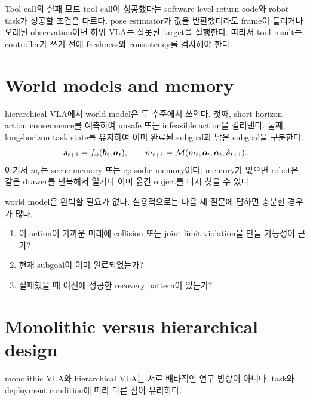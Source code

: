 \begin{warningbox}{Tool call의 실패 모드}
tool call이 성공했다는 software-level return code와 robot task가 성공할 조건은 다르다. pose estimator가 값을 반환했더라도 frame이 틀리거나 오래된 observation이면 하위 VLA는 잘못된 target을 실행한다. 따라서 tool result는 controller가 쓰기 전에 freshness와 consistency를 검사해야 한다.
\end{warningbox}

\section{World models and memory}

hierarchical VLA에서 world model은 두 수준에서 쓰인다. 첫째, short-horizon action consequence를 예측하여 unsafe 또는 infeasible action을 걸러낸다. 둘째, long-horizon task state를 유지하여 이미 완료된 subgoal과 남은 subgoal을 구분한다.
\begin{equation}
  \hat{\bm{s}}_{t+1}
  =
  f_{\varphi}
  (\bm{b}_t,\bm{a}_t),
  \qquad
  m_{t+1}
  =
  \mathcal{M}(m_t,\bm{o}_t,\bm{a}_t,\hat{\bm{s}}_{t+1}).
  \label{eq:ch17-world-memory}
\end{equation}
여기서 $m_t$는 scene memory 또는 episodic memory이다. memory가 없으면 robot은 같은 drawer를 반복해서 열거나 이미 옮긴 object를 다시 찾을 수 있다.

world model은 완벽할 필요가 없다. 실용적으로는 다음 세 질문에 답하면 충분한 경우가 많다.
\begin{enumerate}
  \item 이 action이 가까운 미래에 collision 또는 joint limit violation을 만들 가능성이 큰가?
  \item 현재 subgoal이 이미 완료되었는가?
  \item 실패했을 때 이전에 성공한 recovery pattern이 있는가?
\end{enumerate}

\section{Monolithic versus hierarchical design}

monolithic VLA와 hierarchical VLA는 서로 배타적인 연구 방향이 아니다. task와 deployment condition에 따라 다른 점이 유리하다.

